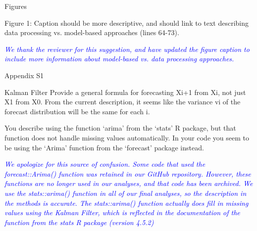 \documentclass{article}
\begin{document}
\begin{linenumbers}
Figures

Figure 1: Caption should be more descriptive, and should link to text describing data processing vs. model-based approaches (lines 64-73).

\noindent \textcolor{blue}{\textit{We thank the reviewer for this suggestion, and have updated the figure caption to include more information about model-based vs. data processing approaches.}}

Appendix S1

Kalman Filter
Provide a general formula for forecasting Xi+1 from Xi, not just X1 from X0. From the current description, it seems like the variance vi of the forecast distribution will be the same for each i.

\noindent \textcolor{blue}{\textit{}} 

You describe using the function ‘arima’ from the ‘stats’ R package, but that function does not handle missing values automatically. In your code you seem to be using the ‘Arima’ function from the ‘forecast’ package instead.
 
\noindent \textcolor{blue}{\textit{We apologize for this source of confusion. Some code that used the forecast::Arima() function was retained in our GitHub repository. However, these functions are no longer used in our analyses, and that code has been archived. We use the stats::arima() function in all of our final analyses, so the description in the methods is accurate. The stats::arima() function actually does fill in missing values using the Kalman Filter, which is reflected in the documentation of the function from the stats R package (version 4.5.2)}}

\end{linenumbers}
\end{document}
